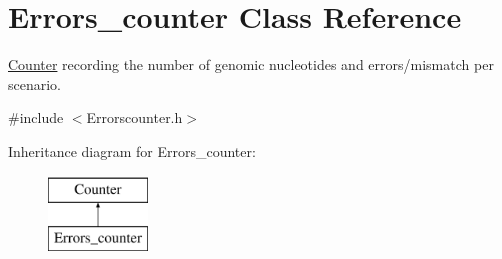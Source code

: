 \hypertarget{classErrors__counter}{}\section{Errors\+\_\+counter Class Reference}
\label{classErrors__counter}


\hyperlink{classCounter}{Counter} recording the number of genomic nucleotides and errors/mismatch per scenario.  




{\ttfamily \#include $<$Errorscounter.\+h$>$}

Inheritance diagram for Errors\+\_\+counter\+:\begin{figure}[H]
\begin{center}
\leavevmode
\includegraphics[height=2.000000cm]{d5/d0d/classErrors__counter}
\end{center}
\end{figure}
